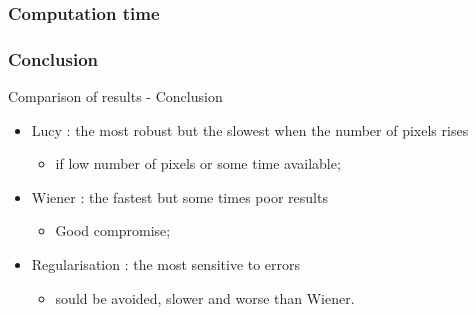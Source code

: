 \subsubsection{Computation time}
\subsubsection{Conclusion}
\begin{frame}{Comparison of results - Conclusion}
\begin{itemize}
\item Lucy : the most robust but the slowest when the number of pixels rises 
\begin{itemize}
\item if low number of pixels or some time available;
\end{itemize}
\item Wiener : the fastest but some times poor results 
\begin{itemize}
\item Good compromise;
\end{itemize} 
\item Regularisation : the most sensitive to errors 
\begin{itemize}
\item sould be avoided, slower and worse than Wiener.
\end{itemize}
\end{itemize}

\end{frame}

